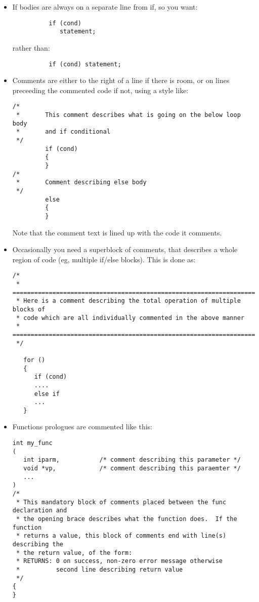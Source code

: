 \documentclass[11pt]{article}
\begin{document}
\begin{itemize}
\item If bodies are always on a separate line from if, so you want:
      \vspace*{-0.1in}
      \begin{verbatim}
          if (cond)
             statement;
      \end{verbatim}
      \vspace*{-0.3in}
      rather than:
      \vspace*{-0.1in}
      \begin{verbatim}
          if (cond) statement;
      \end{verbatim}
\item Comments are either to the right of a line if there is room, or on
      lines preceeding the commented code if not, using a style like:
      \vspace*{-0.1in}
      \begin{verbatim}
/*
 *       This comment describes what is going on the below loop body
 *       and if conditional
 */
         if (cond)
         {
         }
/*
 *       Comment describing else body
 */
         else
         {
         }
      \end{verbatim}
      \vspace*{-0.2in}
       Note that the comment text is lined up with the code it comments.
\item Occasionally you need a superblock of comments, that describes a whole
      region of code (eg, multiple if/else blocks).  This is done as:
      \vspace*{-0.1in}
\begin{verbatim}
/*
 * ======================================================================
 * Here is a comment describing the total operation of multiple blocks of
 * code which are all individually commented in the above manner
 * ======================================================================
 */

   for ()
   {
      if (cond)
      ....
      else if
      ...
   }
\end{verbatim}
\item Functions prologues are commented like this:
\begin{verbatim}
int my_func
(
   int iparm,           /* comment describing this parameter */
   void *vp,            /* comment describing this paraemter */
   ...
)
/*
 * This mandatory block of comments placed between the func declaration and
 * the opening brace describes what the function does.  If the function
 * returns a value, this block of comments end with line(s) describing the
 * the return value, of the form:
 * RETURNS: 0 on success, non-zero error message otherwise
 *          second line describing return value
 */
{
}
\end{verbatim}

\end{itemize}
\end{document}
